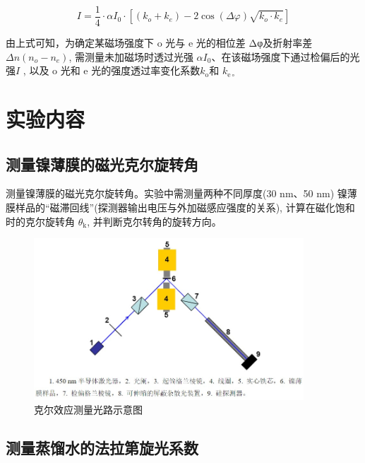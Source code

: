 \documentclass[a4paper,UTF8]{ctexart}
\begin{document}
\begin{equation}
I=\frac{1}{4} \cdot \alpha I_0 \cdot\left[\left(k_o+k_e\right)-2 \cos (\Delta \varphi) \sqrt{k_o \cdot k_e}\right]
\end{equation}

 由上式可知，为确定某磁场强度下 o 光与 e 光的相位差 Δφ及折射率差 $Δn (n_o-n_e)$, 需测量未加磁场时透过光强 $\alpha I_0$、在该磁场强度下通过检偏后的光强$I$ , 以及 o 光和 e 光的强度透过率变化系数$k_\mathrm{o}$和 $k_\mathrm{e\circ}$


\section{实验内容}

\subsection{测量镍薄膜的磁光克尔旋转角}

测量镍薄膜的磁光克尔旋转角。实验中需测量两种不同厚度(30 nm、50 nm) 
镍薄膜样品的“磁滞回线”(探测器输出电压与外加磁感应强度的关系),
 计算在磁化饱和时的克尔旋转角 $\theta_\mathrm{k}$, 并判断克尔转角的旋转方向。



\begin{figure}[H]
    \centering
    \begin{minipage}[b]{0.9\textwidth}
        \centering
        \includegraphics[width=0.9\textwidth]{./fig1.jpg}
        \caption{克尔效应测量光路示意图}
    \end{minipage}
\end{figure}

\subsection{测量蒸馏水的法拉第旋光系数}
\end{document}
